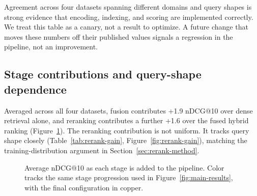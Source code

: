 \documentclass[11pt]{article}
\begin{document}
Agreement across four datasets spanning different domains and query shapes is strong evidence that encoding, indexing, and scoring are implemented correctly. We treat this table as a canary, not a result to optimize. A future change that moves these numbers off their published values signals a regression in the pipeline, not an improvement.

\subsection{Stage contributions and query-shape dependence}
\label{sec:stage-contrib}

Averaged across all four datasets, fusion contributes +1.9 nDCG@10 over dense retrieval alone, and reranking contributes a further +1.6 over the fused hybrid ranking (Figure~\ref{fig:waterfall}). The reranking contribution is not uniform. It tracks query shape closely (Table~\ref{tab:rerank-gain}, Figure~\ref{fig:rerank-gain}), matching the training-distribution argument in Section~\ref{sec:rerank-method}.

\begin{figure}[htbp]
\centering
{}
\caption{Average nDCG@10 as each stage is added to the pipeline. Color tracks the same stage progression used in Figure~\ref{fig:main-results}, with the final configuration in copper.}
\label{fig:waterfall}
\end{figure}
\end{document}
